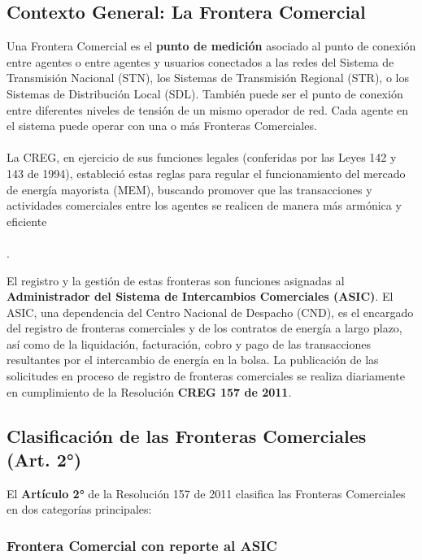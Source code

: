\documentclass[a5paper]{book}%
\begin{document}
\subsection{Contexto General: La Frontera Comercial}

Una Frontera Comercial es el \textbf{punto de medición} asociado al punto de conexión entre agentes o entre agentes y usuarios conectados a las redes del Sistema de Transmisión Nacional (STN), los Sistemas de Transmisión Regional (STR), o los Sistemas de Distribución Local (SDL). También puede ser el punto de conexión entre diferentes niveles de tensión de un mismo operador de red. Cada agente en el sistema puede operar con una o más Fronteras Comerciales.\\\\

La CREG, en ejercicio de sus funciones legales (conferidas por las Leyes 142 y 143 de 1994), estableció estas reglas para regular el funcionamiento del mercado de energía mayorista (MEM), buscando promover que las transacciones y actividades comerciales entre los agentes se realicen de manera más armónica y eficiente\\\\.

El registro y la gestión de estas fronteras son funciones asignadas al \textbf{Administrador del Sistema de Intercambios Comerciales (ASIC)}. El ASIC, una dependencia del Centro Nacional de Despacho (CND), es el encargado del registro de fronteras comerciales y de los contratos de energía a largo plazo, así como de la liquidación, facturación, cobro y pago de las transacciones resultantes por el intercambio de energía en la bolsa. La publicación de las solicitudes en proceso de registro de fronteras comerciales se realiza diariamente en cumplimiento de la Resolución \textbf{CREG 157 de 2011}.

\subsection{Clasificación de las Fronteras Comerciales (Art. 2°)}

El \textbf{Artículo 2°} de la Resolución 157 de 2011 clasifica las Fronteras Comerciales en dos categorías principales:

\subsubsection{Frontera Comercial con reporte al ASIC}
\end{document}
